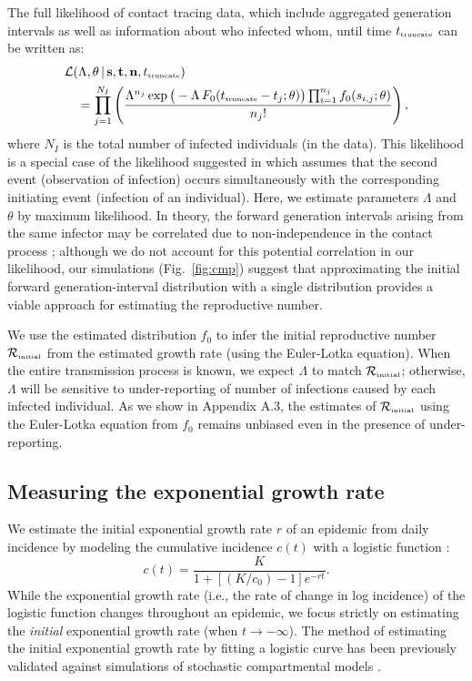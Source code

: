 \documentclass[12pt]{article}
\newcommand{\fref}[1]{Fig.~\ref{fig:#1}}
\newcommand{\Rx}[1]{\ensuremath{{\mathcal R}_{#1}}\xspace}
\newcommand{\Rini}{\Rx{\textrm{\tiny initial}}}
\newcommand{\tsub}[2]{#1_{{\textrm{\tiny #2}}}}
\begin{document}
The full likelihood of contact tracing data, which include aggregated generation intervals as well as information about who infected whom, until time $\tsub{t}{truncate}$ can be written as:
\begin{equation}\label{eq:nonhomogeneous}
\begin{aligned}
&\mathcal{L}(\Lambda, \theta\,|\, \mathbf{s}, \mathbf{t}, \mathbf{n}, \tsub{t}{truncate})\\
&\quad=\prod_{j=1}^{N_I} \left(\frac{\Lambda^{n_j} \exp \big(- \Lambda\, F_0(\tsub{t}{truncate} - t_j ;\theta) \big) \prod_{i=1}^{n_j} f_0(s_{i, j}; \theta)}{n_j!} \right),
\end{aligned}
\end{equation}
where $N_I$ is the total number of infected individuals (in the data).
This likelihood is a special case of the likelihood suggested in \citep{kalbfleisch1989inference} which assumes that the second event (observation of infection) occurs simultaneously with the corresponding initiating event (infection of an individual).
Here, we estimate parameters $\Lambda$ and $\theta$ by maximum likelihood.
In theory, the forward generation intervals arising from the same infector may be correlated due to non-independence in the contact process \citep{yan2008separate}; although we do not account for this potential correlation in our likelihood, our simulations (\fref{cmp}) suggest that approximating the initial forward generation-interval distribution with a single distribution provides a viable approach for estimating the reproductive number.

We use the estimated distribution $f_0$ to infer the initial reproductive number $\Rini$ from the estimated growth rate (using the Euler-Lotka equation).
When the entire transmission process is known, we expect $\Lambda$ to match $\Rini$;
otherwise, $\Lambda$ will be sensitive to under-reporting of number of infections caused by each infected individual.
As we show in Appendix A.3, the estimates of $\Rini$ using the Euler-Lotka equation from $f_0$ remains unbiased even in the presence of under-reporting.

\subsection{Measuring the exponential growth rate}

We estimate the initial exponential growth rate $r$ of an epidemic from daily incidence by modeling the cumulative incidence $c(t)$ with a logistic function \citep{ma2014estimating}:
\begin{equation}
c(t) = \frac{K}{1 + \left[(K/c_0)-1\right]e^{-rt}}.
\end{equation}
While the exponential growth rate (i.e., the rate of change in log incidence) of the logistic function changes throughout an epidemic,
we focus strictly on estimating the \emph{initial} exponential growth rate (when $t \to -\infty$).
The method of estimating the initial exponential growth rate by fitting a logistic curve has been previously validated against simulations of stochastic compartmental models \citep{ma2014estimating}.
\end{document}
